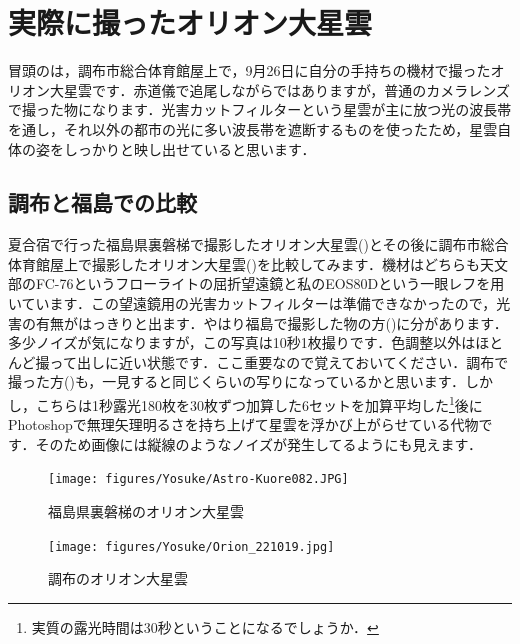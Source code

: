 \documentclass[supernova_2023]{subfiles}
\begin{document}
\section{実際に撮ったオリオン大星雲}
冒頭のは，調布市総合体育館屋上で，9月26日に自分の手持ちの機材で撮ったオリオン大星雲です．赤道儀で追尾しながらではありますが，普通のカメラレンズで撮った物になります．光害カットフィルターという星雲が主に放つ光の波長帯を通し，それ以外の都市の光に多い波長帯を遮断するものを使ったため，星雲自体の姿をしっかりと映し出せていると思います．

\subsection{調布と福島での比較}
夏合宿で行った福島県裏磐梯で撮影したオリオン大星雲()とその後に調布市総合体育館屋上で撮影したオリオン大星雲()を比較してみます．機材はどちらも天文部のFC-76というフローライトの屈折望遠鏡と私のEOS80Dという一眼レフを用いています．この望遠鏡用の光害カットフィルターは準備できなかったので，光害の有無がはっきりと出ます．やはり福島で撮影した物の方()に分があります．多少ノイズが気になりますが，この写真は10秒1枚撮りです．色調整以外はほとんど撮って出しに近い状態です．ここ重要なので覚えておいてください．調布で撮った方()も，一見すると同じくらいの写りになっているかと思います．しかし，こちらは1秒露光180枚を30枚ずつ加算した6セットを加算平均した\footnote{実質の露光時間は30秒ということになるでしょうか．}後にPhotoshopで無理矢理明るさを持ち上げて星雲を浮かび上がらせている代物です．そのため画像には縦線のようなノイズが発生してるようにも見えます．
\begin{figure}[H]
  \centering
  \begin{minipage}{0.4\columnwidth}
    \centering
    \vspace{3.7mm}
    \texttt{[image: figures/Yosuke/Astro-Kuore082.JPG]}
    \vspace{-1.5\zw}
    \caption{福島県裏磐梯のオリオン大星雲}
    \label{fig:FukushimaOrion}
  \end{minipage}
  \begin{minipage}{0.4\columnwidth}
    \centering
    \texttt{[image: figures/Yosuke/Orion\_221019.jpg]}
    \caption{調布のオリオン大星雲}
    \label{fig:ChofuOrion}
  \end{minipage}
\end{figure}
\end{document}
